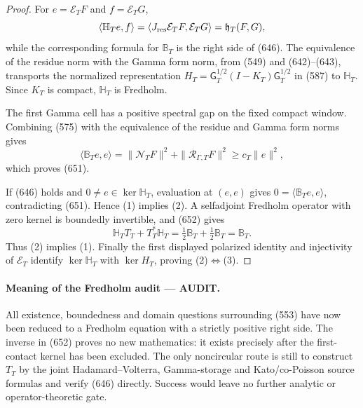 \documentclass[11pt]{article}
\newcommand{\AUDIT}{\textcolor{orange!75!black}{\textbf{AUDIT}}}
\begin{document}
\begin{proof}
For \(e=\mathcal E_TF\) and \(f=\mathcal E_TG\),
\[
 \langle\mathbb H_Te,f\rangle
 =\langle J_{\rm res}\mathcal E_TF,\mathcal E_TG\rangle
 =\mathfrak h_T(F,G),
\]
while the corresponding formula for \(\mathbb B_T\) is the right side of
(646).  The equivalence of the residue norm with the Gamma form norm,
from (549) and (642)--(643), transports the normalized representation
\(H_T=\mathsf G_T^{1/2}(I-K_T)\mathsf G_T^{1/2}\) in (587) to
\(\mathbb H_T\).  Since \(K_T\) is compact, \(\mathbb H_T\) is Fredholm.

The first Gamma cell has a positive spectral gap on the fixed compact
window.  Combining (575) with the equivalence of the residue and Gamma
form norms gives
\[
 \langle\mathbb B_Te,e\rangle
 =\|\mathcal N_TF\|^2+\|\mathcal R_{\Gamma,T}F\|^2
 \ge c_T\|e\|^2,
\]
which proves (651).

If (646) holds and \(0\ne e\in\ker\mathbb H_T\), evaluation at
\((e,e)\) gives \(0=\langle\mathbb B_Te,e\rangle\), contradicting
(651).  Hence (1) implies (2).  A selfadjoint Fredholm operator with zero
kernel is boundedly invertible, and (652) gives
\[
 \mathbb H_TT_T+T_T^*\mathbb H_T
 =\tfrac12\mathbb B_T+\tfrac12\mathbb B_T
 =\mathbb B_T.
\]
Thus (2) implies (1).  Finally the first displayed polarized identity and
injectivity of \(\mathcal E_T\) identify
\(\ker\mathbb H_T\) with \(\ker H_T\), proving (2)\(\Leftrightarrow\)(3).
\end{proof}

\paragraph{Meaning of the Fredholm audit --- \AUDIT.}
All existence, boundedness and domain questions surrounding (553) have now
been reduced to a Fredholm equation with a strictly positive right side.
The inverse in (652) proves no new mathematics: it exists precisely after
the first-contact kernel has been excluded.  The only noncircular route is
still to construct \(T_T\) by the joint Hadamard--Volterra,
Gamma-storage and Kato/co-Poisson source formulas and verify (646)
directly.  Success would leave no further analytic or operator-theoretic
gate.
\end{document}
